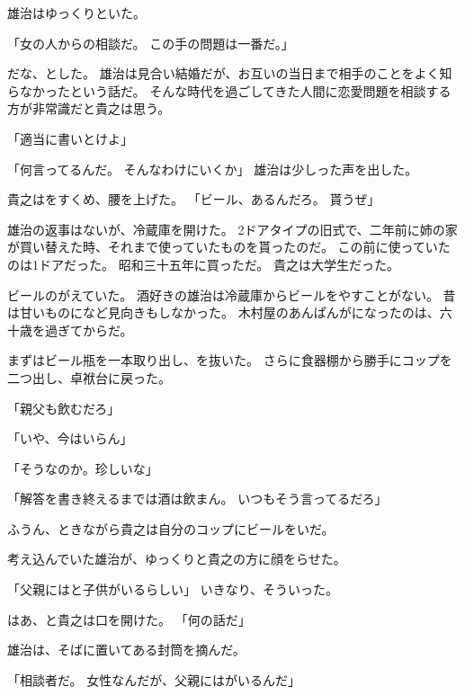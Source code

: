 \documentclass[chapter3.tex]{subfiles}
\begin{document}
\begin{CJK}{UTF8}{ipxm}
    雄治はゆっくりといた。
    
    「女の人からの相談だ。
    この手の問題は一番だ。」
    
    だな、とした。
    雄治は見合い結婚だが、お互いの当日まで相手のことをよく知らなかったという話だ。
    そんな時代を過ごしてきた人間に恋愛問題を相談する方が非常識だと貴之は思う。

    「適当に書いとけよ」

    「何言ってるんだ。
    そんなわけにいくか」
    雄治は少しった声を出した。

    貴之はをすくめ、腰を上げた。
    「ビール、あるんだろ。
    貰うぜ」

    雄治の返事はないが、冷蔵庫を開けた。
    2ドアタイプの旧式で、二年前に姉の家が買い替えた時、それまで使っていたものを貰ったのだ。
    この前に使っていたのは1ドアだった。
    昭和三十五年に買っただ。
    貴之は大学生だった。
    
    ビールのがえていた。
    酒好きの雄治は冷蔵庫からビールをやすことがない。
    昔は甘いものになど見向きもしなかった。
    木村屋のあんぱんがになったのは、六十歳を過ぎてからだ。

    まずはビール瓶を一本取り出し、を抜いた。
    さらに食器棚から勝手にコップを二つ出し、卓袱台に戻った。

    「親父も飲むだろ」

    「いや、今はいらん」

    「そうなのか。珍しいな」

    「解答を書き終えるまでは酒は飲まん。
    いつもそう言ってるだろ」

    ふうん、ときながら貴之は自分のコップにビールをいだ。
    
    考え込んでいた雄治が、ゆっくりと貴之の方に顔をらせた。

    「父親にはと子供がいるらしい」
    いきなり、そういった。

    はあ、と貴之は口を開けた。
    「何の話だ」

    雄治は、そばに置いてある封筒を摘んだ。

    「相談者だ。
    女性なんだが、父親にはがいるんだ」


\end{CJK}
\end{document}
